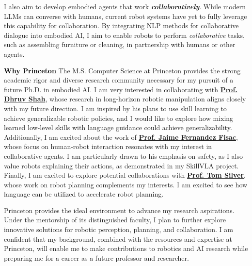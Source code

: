 \documentclass[11pt]{article}
\newcommand{\statement}[1]{\medskip\noindent
  \textcolor{black}{\textbf{#1}}\space
}
\begin{document}
\noindent I also aim to develop embodied agents that work \textbf{\textit{collaboratively}}. While modern LLMs can converse with humans, current robot systems have yet to fully leverage this capability for collaboration. By integrating NLP methods for collaborative dialogue into embodied AI, I aim to enable robots to perform \textit{collaborative} tasks, such as assembling furniture or cleaning, in partnership with humans or other agents.

\statement{Why Princeton} The M.S. Computer Science at Princeton provides the strong academic rigor and diverse research community necessary for my pursuit of a future Ph.D. in embodied AI. I am very interested in collaborating with \href{https://robodhruv.github.io/}{\textbf{Prof. Dhruv Shah}}, whose research in long-horizon robotic manipulation aligns closely with my future direction. I am inspired by his plans to use skill learning to achieve generalizable robotic policies, and I would like to explore how mixing learned low-level skills with language guidance could achieve generalizability. Additionally, I am excited about the work of \href{https://ece.princeton.edu/people/jaime-fernandez-fisac}{\textbf{Prof. Jaime Fernandez Fisac}}, whose focus on human-robot interaction resonates with my interest in collaborative agents. I am particularly drawn to his emphasis on safety, as I also value robots explaining their actions, as demonstrated in my SkillVLA project. Finally, I am excited to explore potential collaborations with \href{https://tomsilver.github.io/}{\textbf{Prof. Tom Silver}}, whose work on robot planning complements my interests. I am excited to see how language can be utilized to accelerate robot planning.

\noindent Princeton provides the ideal environment to advance my research aspirations. Under the mentorship of its distinguished faculty, I plan to further explore innovative solutions for robotic perception, planning, and collaboration. I am confident that my background, combined with the resources and expertise at Princeton, will enable me to make contributions to robotics and AI research while preparing me for a career as a future professor and researcher.
\end{document}
